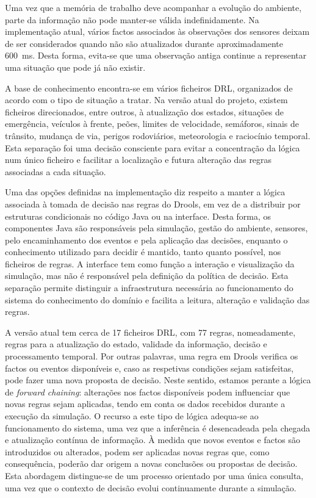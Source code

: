 Uma vez que a memória de trabalho deve acompanhar a evolução do ambiente,
parte da informação não pode manter-se válida indefinidamente. Na
implementação atual, vários factos associados às observações dos sensores
deixam de ser considerados quando não são atualizados durante aproximadamente
600~ms. Desta forma, evita-se que uma observação antiga continue a representar
uma situação que pode já não existir.

A base de conhecimento encontra-se em vários ficheiros DRL, organizados de
acordo com o tipo de situação a tratar. Na versão atual do projeto, existem
ficheiros direcionados, entre outros, à atualização dos estados, situações de
emergência, veículos à frente, peões, limites de velocidade, semáforos, sinais
de trânsito, mudança de via, perigos rodoviários, meteorologia e raciocínio
temporal. Esta separação foi uma decisão consciente para evitar a
concentração da lógica num único ficheiro e facilitar a localização e futura
alteração das regras associadas a cada situação.

Uma das opções definidas na implementação diz respeito a manter a lógica
associada à tomada de decisão nas regras do Drools, em vez de a distribuir por
estruturas condicionais no código Java ou na interface. Desta forma, os
componentes Java são responsáveis pela simulação, gestão do ambiente,
sensores, pelo encaminhamento dos eventos e pela aplicação das decisões,
enquanto o conhecimento utilizado para decidir é mantido, tanto quanto
possível, nos ficheiros de regras. A interface tem como função a interação e
visualização da simulação, mas não é responsável pela definição da política
de decisão. Esta separação permite distinguir a infraestrutura necessária ao
funcionamento do sistema do conhecimento do domínio e facilita a leitura,
alteração e validação das regras.

A versão atual tem cerca de 17 ficheiros DRL, com 77 regras, nomeadamente,
regras para a atualização do estado, validade da informação, decisão e
processamento temporal. Por outras palavras, uma regra em Drools verifica os
factos ou eventos disponíveis e, caso as respetivas condições sejam
satisfeitas, pode fazer uma nova proposta de decisão. Neste sentido, estamos
perante a lógica de \emph{forward chaining}: alterações nos factos disponíveis
podem influenciar que novas regras sejam aplicadas, tendo em conta os dados
recebidos durante a execução da simulação. O recurso a este tipo de lógica
adequa-se ao funcionamento do sistema, uma vez que a inferência é desencadeada
pela chegada e atualização contínua de informação. À medida que novos eventos
e factos são introduzidos ou alterados, podem ser aplicadas novas regras que,
como consequência, poderão dar origem a novas conclusões ou propostas de
decisão. Esta abordagem distingue-se de um processo orientado por uma única
consulta, uma vez que o contexto de decisão evolui continuamente durante a
simulação.

